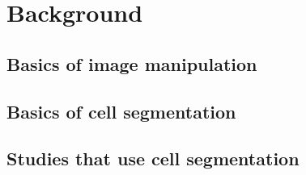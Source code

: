 
\chapter{Background}

\ifpdf
    \graphicspath{{Chapter2/Figs/Raster/}{Chapter2/Figs/PDF/}{Chapter2/Figs/}}
\else
    \graphicspath{{Chapter2/Figs/Vector/}{Chapter2/Figs/}}
\fi

\section{Basics of image manipulation}


\section{Basics of cell segmentation}


\section{Studies that use cell segmentation}
